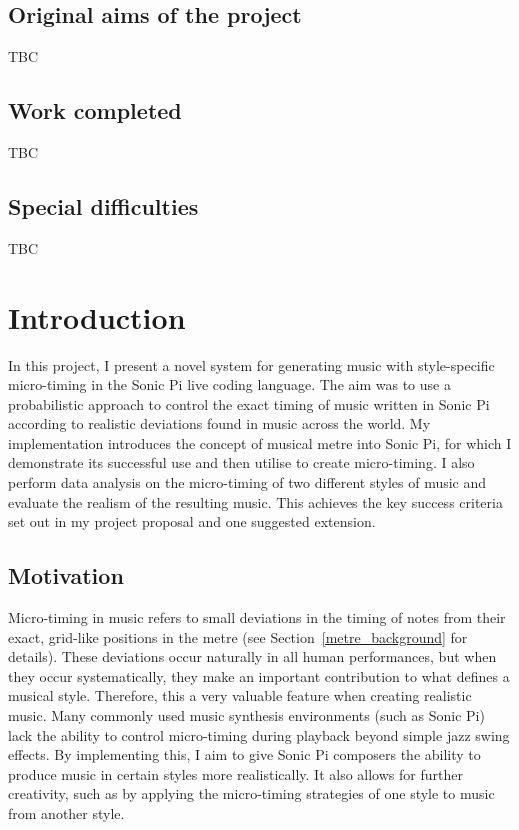 \documentclass[12pt,twoside,openright]{report}
\begin{document}
\section*{Original aims of the project}

TBC

\section*{Work completed}

TBC

\section*{Special difficulties}

TBC
 
\newpage
\tableofcontents


\pagestyle{headings}





\chapter{Introduction} \label{introduction}

In this project, I present a novel system for generating music with
style-specific micro-timing in the Sonic Pi live coding language. The aim was to
use a probabilistic approach to control the exact timing of music written in
Sonic Pi according to realistic deviations found in music across the world. My
implementation introduces the concept of musical metre into Sonic Pi, for which
I demonstrate its successful use and then utilise to create micro-timing. I also
perform data analysis on the micro-timing of two different styles of music and
evaluate the realism of the resulting music. This achieves the key success
criteria set out in my project proposal and one suggested extension.



\section{Motivation} \label{motivation}

Micro-timing in music refers to small deviations in the timing of notes from
their exact, grid-like positions in the metre (see Section~\ref{metre_background} for details). These
deviations occur naturally in all human performances, but when they occur
systematically, they make an important contribution to what defines a musical
style. Therefore, this a very valuable feature when creating realistic music.
Many commonly used music synthesis environments (such as Sonic Pi) lack the
ability to control micro-timing during playback beyond simple jazz swing effects.
By implementing this, I aim to give Sonic Pi composers the ability to produce
music in certain styles more realistically. It also allows for further
creativity, such as by applying the micro-timing strategies of one style to
music from another style.
\end{document}
